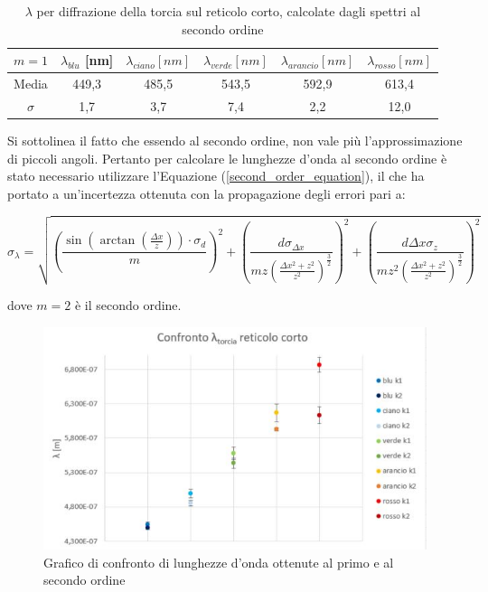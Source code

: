 \documentclass{article}
\begin{document}
\begin{table}[h!]
    \centering
\begin{tabular}{||c|c|c|c|c|c||}
    \hline
     $m = 1$ & \cellcolor{blue}$\lambda_{blu}$ [nm] & \cellcolor{cyan}$\lambda_{ciano} [nm]$ & \cellcolor{green}$\lambda_{verde}[nm]$ & \cellcolor{orange}$\lambda_{arancio}[nm]$ & \cellcolor{red}$\lambda_{rosso}[nm]$ \\
    \hline
    Media & 449,3 & 485,5 & 543,5 & 592,9 & 613,4 \\
    $\sigma$ & 1,7 & 3,7 & 7,4 & 2,2 & 12,0\\
    \hline
\end{tabular}
\caption{$\lambda$ per diffrazione della torcia sul reticolo corto, calcolate dagli spettri al secondo ordine}
\end{table}

Si sottolinea il fatto che essendo al secondo ordine, non vale più l'approssimazione di piccoli angoli. Pertanto per calcolare le lunghezze d'onda al secondo ordine è stato necessario utilizzare l'Equazione (\ref{second_order_equation}), il che ha portato a un'incertezza ottenuta con la propagazione degli errori pari a:

\begin{equation}
    \sigma_\lambda = \sqrt{\left(\frac{\sin(\arctan(\frac{\Delta x}{z}))\cdot \sigma_d}{m}\right)^2 + \left(\frac{d\sigma_{\Delta x}}{mz\left(\frac{\Delta x^2 + z^2}{z^2}\right)^\frac{3}{2}}\right)^2 + \left(\frac{d\Delta x \sigma_z}{mz^2\left(\frac{\Delta x^2+z^2}{z^2}\right)^\frac{3}{2}}\right)^2}
\end{equation}

dove $m=2$ è il secondo ordine.
\pagebreak
\begin{figure}
    \centering 
    \includegraphics[width=0.6\linewidth]{TorciaCorto_graph.JPG}
    \caption{Grafico di confronto di lunghezze d'onda ottenute al primo e al secondo ordine}
    \label{confrontoCorto}
\end{figure}
\end{document}
